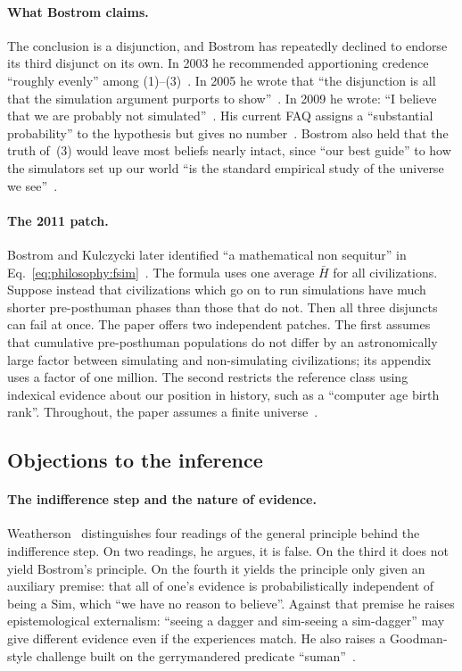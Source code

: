 \paragraph{What Bostrom claims.}
The conclusion is a disjunction, and Bostrom has repeatedly declined to endorse its third
disjunct on its own. In 2003 he recommended apportioning credence ``roughly evenly''
among (1)--(3)~\cite[\S\,VII]{Bostrom2003are}. In 2005 he wrote that ``the disjunction is
all that the simulation argument purports to show''~\cite[\S\,1]{Bostrom2005simulation}. In
2009 he wrote: ``I believe that we are probably not simulated''~\cite{Bostrom2009simulation}.
His current FAQ assigns a ``substantial probability'' to the hypothesis but gives no
number~\cite[Q2]{Bostrom2025simulation}. Bostrom also held that the truth of~(3) would
leave most beliefs nearly intact, since ``our best guide'' to how the simulators set up
our world ``is the standard empirical study of the universe we
see''~\cite[\S\,VI]{Bostrom2003are}.

\paragraph{The 2011 patch.}
Bostrom and Kulczycki later identified ``a mathematical non sequitur'' in
Eq.~\eqref{eq:philosophy:fsim}~\cite{Bostrom2011patch}. The formula uses one average
$\bar H$ for all civilizations. Suppose instead that civilizations which go on to run
simulations have much shorter pre-posthuman phases than those that do not. Then all
three disjuncts can fail at once. The paper offers two independent patches. The first
assumes that cumulative pre-posthuman populations do not differ by an astronomically
large factor between simulating and non-simulating civilizations; its appendix uses a
factor of one million. The second restricts the reference class using indexical evidence
about our position in history, such as a ``computer age birth rank''. Throughout, the
paper assumes a finite universe~\cite{Bostrom2011patch}.

\subsection{Objections to the inference}
\label{sec:philosophy:objections}

\paragraph{The indifference step and the nature of evidence.}
Weatherson~\cite{Weatherson2003are} distinguishes four readings of the general principle
behind the indifference step. On two readings, he argues, it is false. On the third it
does not yield Bostrom's principle. On the fourth it yields the principle only given an
auxiliary premise: that all of one's evidence is probabilistically independent of being
a Sim, which ``we have no reason to believe''. Against that premise he raises
epistemological externalism: ``seeing a dagger and sim-seeing a sim-dagger'' may give
different evidence even if the experiences match. He also raises a Goodman-style
challenge built on the gerrymandered predicate ``suman''~\cite{Weatherson2003are}.

